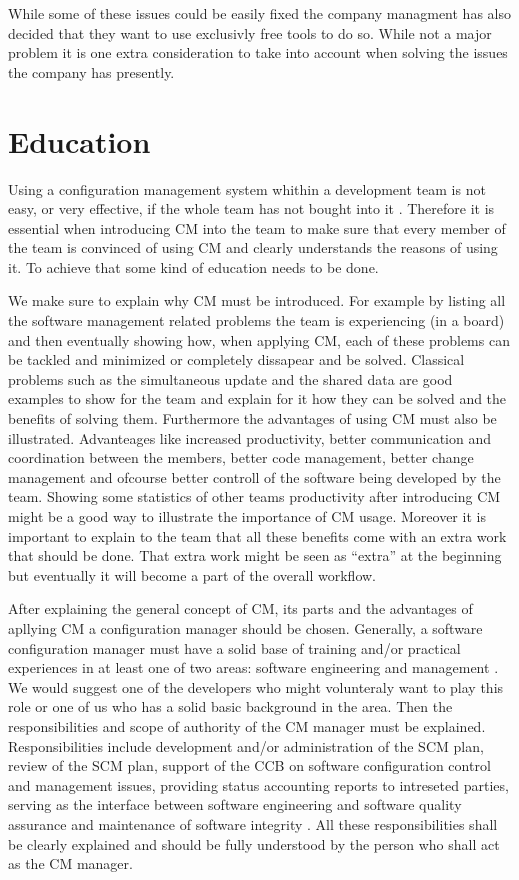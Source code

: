 \documentclass[a4paper]{article}
\begin{document}
While some of these issues could be easily fixed the company managment has also decided that they want to use exclusivly free tools to do so. While not a major problem it is one extra consideration to take into account when solving the issues the company has presently.

\section{Education}
Using a configuration management system whithin a development team is not easy, or very effective, if the whole team has not bought into it \cite{mikkelsen-pherigo}. Therefore it is essential when introducing CM into the team to make sure that every member of the team is convinced of using CM and clearly understands the reasons of using it. To achieve that some kind of education needs to be done.

We make sure to explain why CM must be introduced. For example by listing all the software management related problems the team is experiencing (in a board) and then eventually showing how, when applying CM, each of these problems can be tackled and minimized or completely dissapear and be solved. Classical problems such as the simultaneous update and the shared data are good examples to show for the team and explain for it how they can be solved and the benefits of solving them. Furthermore the advantages of using CM must also be illustrated. Advanteages like increased productivity, better communication and coordination between the members, better code management, better change management and ofcourse better controll of the software being developed by the team. Showing some statistics of other teams productivity after introducing CM might be a good way to illustrate the importance of CM usage. Moreover it is important to explain to the team that all these benefits come with an extra work that should be done. That extra work might be seen as “extra” at the beginning but eventually it will become a part of the overall workflow. 

After explaining the general concept of CM, its parts and the advantages of apllying CM a configuration manager should be chosen. Generally, a software configuration manager must have a solid base of training and/or practical experiences in at least one of two areas: software engineering and management \cite{compton}.  We would suggest one of the developers who might volunteraly want to play this role or one of us who has a solid basic background in the area. Then the responsibilities and scope of authority of the CM manager must be explained. Responsibilities include development and/or administration of the SCM plan, review of the SCM plan, support of the CCB on software configuration control and management issues, providing status accounting reports to intreseted parties, serving as the interface between software engineering and software quality assurance and maintenance of software integrity \cite{compton}. All these responsibilities shall be clearly explained and should be fully understood by the person who shall act as the CM manager. 
\end{document}
